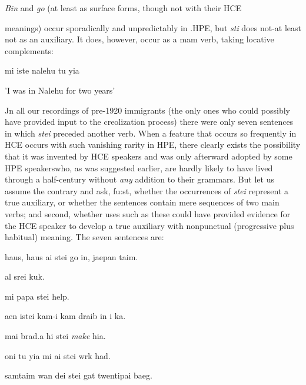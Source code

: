\textit{Bin }and \textit{go }(at least as surface forms, though not with their HCE

meanings) occur sporadically and unpredictably in .HPE, but \textit{s}\textit{t}\textit{i} does not-at least not as an auxiliary. It does, however, occur as a mam verb, taking locative complements:

\ea\label{ex:44}
mi iste nalehu tu yia
\glt
\z

'I was in Nalehu for two years'

Jn all our recordings of pre{}-1920 immigrants (the only ones who could possibly have provided input to the creolization process) there were only seven sentences in which \textit{stei} preceded another verb. When a feature that occurs so frequently in HCE occurs with such vanishing rarity in HPE, there clearly exists the possibility that it was invented by HCE speakers and was only afterward adopted by some HPE speakers\-who, as was suggested earlier, are hardly likely to have lived through a half-century without \textit{any} addition to their grammars. But let us assume the contrary and ask, fu:st, whether the occurrences of \textit{stei} represent
a true auxiliary, or whether the sentences contain mere sequences of two main verbs; and second, whether uses such as these could have provided evidence for the HCE speaker to develop a true auxiliary with nonpunctual (progressive plus habitual) meaning. The seven sentences are:

\ea\label{ex:45}
haus, haus ai stei go in, jaepan taim.
\glt
\z

\ea\label{ex:46}
al srei kuk.
\glt
\z

\ea\label{ex:47}
mi papa stei help.
\glt
\z

\ea\label{ex:48}
aen istei kam-i kam draib in i ka.
\glt
\z

\ea\label{ex:49}
mai brad.a hi stei \textit{make} hia.
\glt
\z

\ea\label{ex:50}
oni tu yia mi ai stei wrk had.
\glt
\z

\ea\label{ex:51}
samtaim wan dei stei gat twentipai baeg.
\glt
\z

